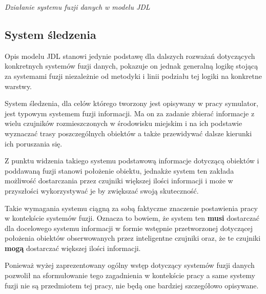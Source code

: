 \par{
\begin{center}
\textit{Działanie systemu fuzji danych w modelu JDL}
\end{center}

\subsection{System śledzenia}
\par{
Opis modelu JDL stanowi jedynie podstawę dla dalszych rozważań dotyczących konkretnych systemów fuzji danych, pokazuje on jednak generalną logikę stojącą za systemami fuzji niezależnie od metodyki i linii podziału tej logiki na konkretne warstwy.
}
\par{
System śledzenia, dla celów którego tworzony jest opisywany w pracy symulator, jest typowym systemem fuzji informacji. Ma on za zadanie zbierać informacje z wielu czujników rozmieszczonych w środowisku miejskim i na ich podstawie wyznaczać trasy poszczególnych obiektów a także przewidywać dalsze kierunki ich poruszania się.
}
\par{
Z punktu widzenia takiego systemu podstawową informacje dotyczącą obiektów i poddawaną fuzji stanowi położenie obiektu, jednakże system ten zakłada możliwość dostarczania przez czujniki większej ilości informacji i może w przyszłości wykorzystywać je by zwiększać swoją skuteczność.
}
\par{
Takie wymagania systemu ciągną za sobą faktyczne znaczenie postawienia pracy w kontekście systemów fuzji. Oznacza to bowiem, że system ten \textbf{musi} dostarczać dla docelowego systemu informacji w formie wstępnie przetworzonej dotyczącej położenia obiektów obserwowanych przez inteligentne czujniki oraz, że te czujniki \textbf{mogą} dostarczać większej ilości informacji.
}
\par{
Ponieważ wyżej zaprezentowany ogólny wstęp dotyczący systemów fuzji danych pozwolił na sformułowanie tego zagadnienia w kontekście pracy a same systemy fuzji nie są przedmiotem tej pracy, nie będą one bardziej szczegółowo opisywane.
}

}
